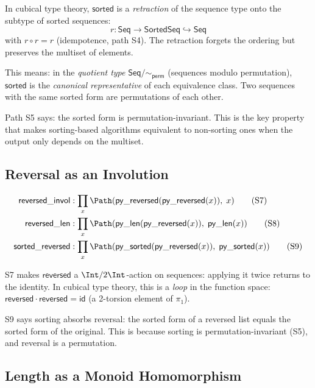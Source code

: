 \begin{remark}
In cubical type theory, $\mathsf{sorted}$ is a \emph{retraction}
of the sequence type onto the subtype of sorted sequences:
\[
  r : \mathsf{Seq} \to \mathsf{SortedSeq} \hookrightarrow \mathsf{Seq}
\]
with $r \circ r = r$ (idempotence, path S4).  The retraction forgets
the ordering but preserves the multiset of elements.

This means: in the \emph{quotient type} $\mathsf{Seq}/\sim_\mathsf{perm}$
(sequences modulo permutation), $\mathsf{sorted}$ is the
\emph{canonical representative} of each equivalence class.  Two
sequences with the same sorted form are permutations of each other.

Path S5 says: the sorted form is permutation-invariant.  This is the
key property that makes sorting-based algorithms equivalent to
non-sorting ones when the output only depends on the multiset.
\end{remark}

\subsection{Reversal as an Involution}

\begin{definition}
\begin{align}
  \mathsf{reversed\_invol} &: \prod_x
    \Path(\mathsf{py\_reversed}(\mathsf{py\_reversed}(x)),\; x)
    \tag{S7} \\
  \mathsf{reversed\_len} &: \prod_x
    \Path(\mathsf{py\_len}(\mathsf{py\_reversed}(x)),\;
          \mathsf{py\_len}(x))
    \tag{S8} \\
  \mathsf{sorted\_reversed} &: \prod_x
    \Path(\mathsf{py\_sorted}(\mathsf{py\_reversed}(x)),\;
          \mathsf{py\_sorted}(x))
    \tag{S9}
\end{align}
\end{definition}

S7 makes $\mathsf{reversed}$ a $\Int/2\Int$-action on sequences:
applying it twice returns to the identity.  In cubical type theory,
this is a \emph{loop} in the function space:
$\mathsf{reversed} \cdot \mathsf{reversed} = \mathsf{id}$ (a
2-torsion element of $\pi_1$).

S9 says sorting absorbs reversal: the sorted form of a reversed list
equals the sorted form of the original.  This is because sorting
is permutation-invariant (S5), and reversal is a permutation.

\subsection{Length as a Monoid Homomorphism}

